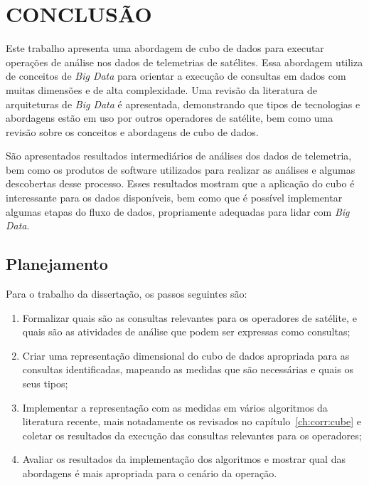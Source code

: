 
\chapter{CONCLUSÃO}\label{ch:concl}

Este trabalho apresenta uma abordagem de cubo de dados para executar operações de análise nos dados de telemetrias de satélites.
Essa abordagem utiliza de conceitos de \textit{Big Data} para orientar a execução de consultas em dados com muitas dimensões e de alta complexidade.
Uma revisão da literatura de arquiteturas de \textit{Big Data} é apresentada, demonstrando que tipos de tecnologias e abordagens estão em uso por outros operadores de satélite, bem como uma revisão sobre os conceitos e abordagens de cubo de dados.

São apresentados resultados intermediários de análises dos dados de telemetria, bem como os produtos de software utilizados para realizar as análises e algumas descobertas desse processo.
Esses resultados mostram que a aplicação do cubo é interessante para os dados disponíveis, bem como que é possível implementar algumas etapas do fluxo de dados, propriamente adequadas para lidar com \textit{Big Data}.

\section{Planejamento}\label{ch:concl:planning}

Para o trabalho da dissertação, os passos seguintes são:

\begin{enumerate}
\item Formalizar quais são as consultas relevantes para os operadores de satélite, e quais são as atividades de análise que podem ser expressas como consultas;
\item Criar uma representação dimensional do cubo de dados apropriada para as consultas identificadas, mapeando as medidas que são necessárias e quais os seus tipos;
\item Implementar a representação com as medidas em vários algoritmos da literatura recente, mais notadamente os revisados no capítulo~\ref{ch:corr:cube} e coletar os resultados da execução das consultas relevantes para os operadores;
\item Avaliar os resultados da implementação dos algoritmos e mostrar qual das abordagens é mais apropriada para o cenário da operação.
\end{enumerate}

